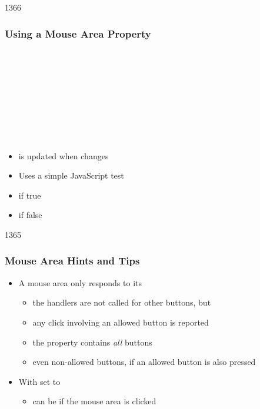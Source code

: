 
\begin{slide}{1366}\frametitle{Using a Mouse Area Property}

\begin{qml}
\\
\\
\\
\vspace*{0.5em}
\\
\\
\\
\\
\\
\qtt{\}}
\end{qml}

\begin{itemize}
\item {} is updated when  changes
\item Uses a simple JavaScript test
\item {} if true
\item {} if false
\end{itemize}

\end{slide}


\begin{slide}{1365}\frametitle{Mouse Area Hints and Tips}

\begin{itemize}
\item A mouse area only responds to its 
  \begin{itemize}
  \item the handlers are not called for other buttons, but
  \item any click involving an allowed button is reported
  \item the  property contains \textit{all} buttons
  \item even non-allowed buttons, if an allowed button is also pressed
  \end{itemize}
\item With  set to 
  \begin{itemize}
  \item {} can be  if the mouse area
  is clicked
  \end{itemize}
\end{itemize}

\end{slide}

